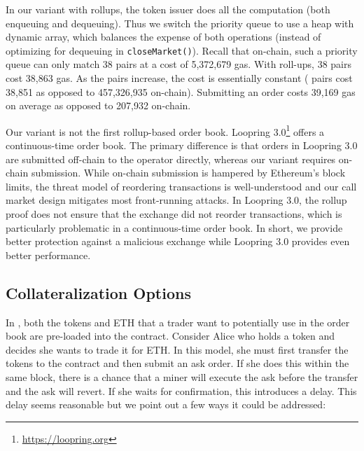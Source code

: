 In our \cm variant with rollups, the token issuer does all the computation (both enqueuing and dequeuing). Thus we switch the priority queue to use a heap with dynamic array, which balances the expense of both operations (instead of optimizing for dequeuing in \texttt{closeMarket()}). Recall that on-chain, such a priority queue can only match 38 pairs at a cost of 5,372,679 gas. With roll-ups, 38 pairs cost 38,863 gas. As the pairs increase, the cost is essentially constant ( pairs cost 38,851 as opposed to 457,326,935 on-chain). Submitting an order costs 39,169 gas on average as opposed to 207,932 on-chain.

Our \cm variant is not the first rollup-based order book. Loopring 3.0\footnote{\url{https://loopring.org}} offers a continuous-time order book. The primary difference is that orders in Loopring 3.0 are submitted off-chain to the operator directly, whereas our variant requires on-chain submission. While on-chain submission is hampered by Ethereum's block limits, the threat model of reordering transactions is well-understood and our call market design mitigates most front-running attacks. In Loopring 3.0, the rollup proof does not ensure that the exchange did not reorder transactions, which is particularly problematic in a continuous-time order book. In short, we provide better protection against a malicious exchange while Loopring 3.0 provides even better performance.


\subsection{Collateralization Options}

In \cm, both the tokens and ETH that a trader want to potentially use in the order book are pre-loaded into the contract. Consider Alice who holds a token and decides she wants to trade it for ETH. In this model, she must first transfer the tokens to the contract and then submit an ask order. If she does this within the same block, there is a chance that a miner will execute the ask before the transfer and the ask will revert. If she waits for confirmation, this introduces a delay. This delay seems reasonable but we point out a few ways it could be addressed: 

